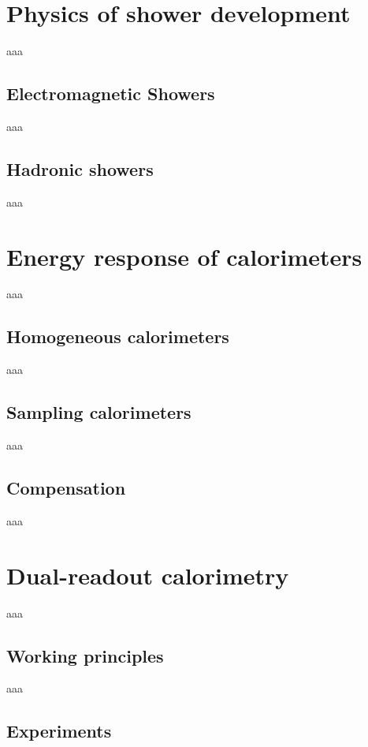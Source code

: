 \section{Physics of shower development}
aaa

\subsection{Electromagnetic Showers}
aaa

\subsection{Hadronic showers}
aaa

\section{Energy response of calorimeters}
aaa

\subsection{Homogeneous calorimeters}
aaa

\subsection{Sampling calorimeters}
aaa

\subsection{Compensation}
aaa

\section{Dual-readout calorimetry}
aaa

\subsection{Working principles}
aaa

\subsection{Experiments}